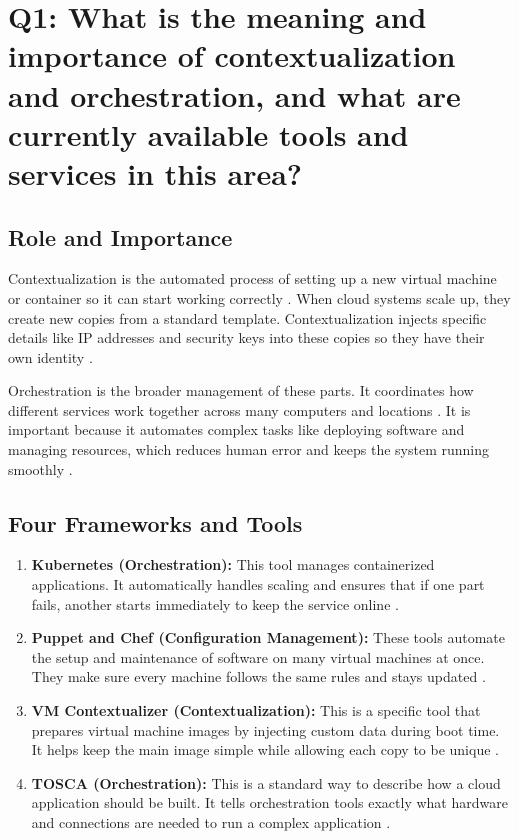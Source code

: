 \section{Q1: What is the meaning and importance of contextualization and orchestration, 
and what are currently available tools and services in this area?}

\subsection*{Role and Importance}
Contextualization is the automated process of setting up a new virtual machine or container so it can start working correctly \cite{armstrong2015}. When cloud systems scale up, they create new copies from a standard template. Contextualization injects specific details like IP addresses and security keys into these copies so they have their own identity \cite{armstrong2015}. 

Orchestration is the broader management of these parts. It coordinates how different services work together across many computers and locations \cite{qian2020}. It is important because it automates complex tasks like deploying software and managing resources, which reduces human error and keeps the system running smoothly \cite{armstrong2015, qian2020}.

\subsection*{Four Frameworks and Tools}
\begin{enumerate}
    \item \textbf{Kubernetes (Orchestration):} This tool manages containerized applications. It automatically handles scaling and ensures that if one part fails, another starts immediately to keep the service online \cite{hariri2018}.
    \item \textbf{Puppet and Chef (Configuration Management):} These tools automate the setup and maintenance of software on many virtual machines at once. They make sure every machine follows the same rules and stays updated \cite{armstrong2015}.
    \item \textbf{VM Contextualizer (Contextualization):} This is a specific tool that prepares virtual machine images by injecting custom data during boot time. It helps keep the main image simple while allowing each copy to be unique \cite{armstrong2015}.
    \item \textbf{TOSCA (Orchestration):} This is a standard way to describe how a cloud application should be built. It tells orchestration tools exactly what hardware and connections are needed to run a complex application \cite{qian2020}.
\end{enumerate}